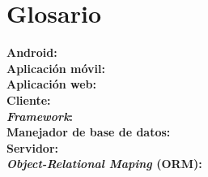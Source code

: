 \chapter*{Glosario}
\noindent
\vspace{5 mm}
\textbf{Android:}\\
\textbf{Aplicación móvil:}\\
\textbf{Aplicación web:}\\
\textbf{Cliente:}\\
\textbf{\textit{Framework}:}\\
\textbf{Manejador de base de datos:}\\
\textbf{Servidor:}\\
\textbf{\textit{Object-Relational Maping} (ORM):}\\